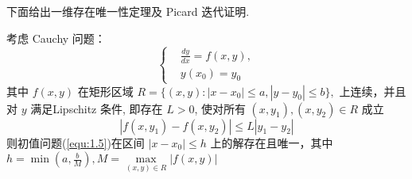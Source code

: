 下面给出一维存在唯一性定理及 Picard 迭代证明.
\begin{thm}[(存在唯一性定理)]\label{thm:1.1.2}
考虑 Cauchy 问题：
\begin{equation}\label{equ:1.5}
\left\{
\begin{aligned}
& \frac{dy}{dx} = f(x,y), \\
& y(x_0) = y_0
\end{aligned}
\right.
\end{equation}
其中 \(f(x,y)\) 在矩形区域 $R=\{(x,y): |x - x_0| \le a, |y - y_0| \le b\},$
上连续，并且对 \(y\) 满足Lipschitz 条件, 即存在 \(L > 0\), 使对所有 \((x, y_1), (x, y_2) \in R\) 成立
\begin{equation*}
|f(x, y_1) - f(x, y_2)| \le L |y_1 - y_2|
\end{equation*}
则初值问题(\ref{equ:1.5})在区间 \(|x - x_0| \le h\) 上的解存在且唯一，其中 \(h = \min(a, \frac{b}{M}), M = \max\limits_{(x,y) \in R} |f(x,y)|\)
\end{thm}

